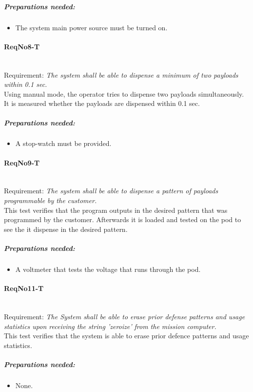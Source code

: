 	\subparagraph{Preparations needed:}
	\begin{itemize}
	\item The system main power source must be turned on.
	\end{itemize}


\paragraph{ReqNo8-T}\mbox{}\\ %
Requirement: \textit{The system shall be able to dispense a minimum of two payloads within 0.1 sec.}
\\
Using manual mode, the operator tries to dispense two payloads simultaneously. It is measured whether the payloads are dispensed within 0.1 sec.
\\
	\subparagraph{Preparations needed:}
	\begin{itemize}
	\item A stop-watch must be provided.
	\end{itemize}

\paragraph{ReqNo9-T}\mbox{}\\ %
Requirement: \textit{The system shall be able to dispense a pattern of payloads programmable by the customer.}
\\
This test verifies that the program outputs in the desired pattern that was programmed by the customer. Afterwards it is loaded and tested on the pod to see the it dispense in the desired pattern.
\\
	\subparagraph{Preparations needed:}
	\begin{itemize}
	\item A voltmeter that tests the voltage that runs through the pod.
	\end{itemize}

\paragraph{ReqNo11-T}\mbox{}\\ %
Requirement: \textit{The System shall be able to erase prior defense patterns and usage statistics upon receiving the string 'zeroize' from the mission computer.}\\
This test verifies that the system is able to erase prior defence patterns and usage statistics.
	\subparagraph{Preparations needed:}
	\begin{itemize}
	\item None.
	\end{itemize}

